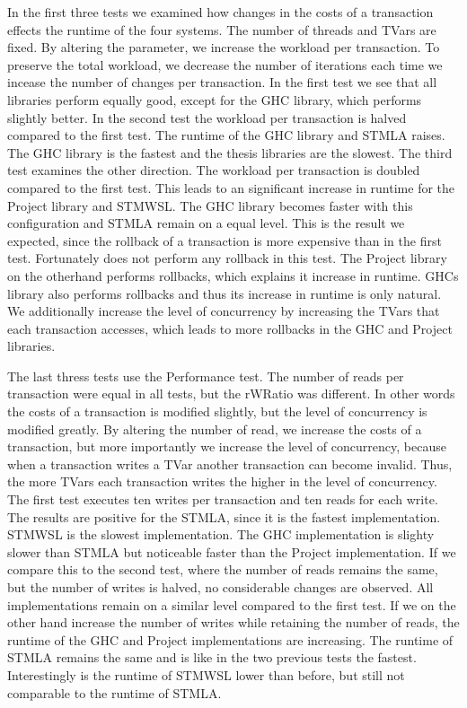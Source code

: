 In the first three tests we examined how changes in the costs of a transaction effects the runtime of the four systems. 
The number of threads and TVars are fixed. By altering the  parameter, we increase the workload per 
transaction. To preserve the total workload, we decrease the number of iterations each time we incease the number
of changes per transaction. In the first test we see that all libraries perform equally good, except for the GHC 
library, which performs slightly better. In the second test the workload per transaction is halved compared to the
first test. The runtime of the GHC library and STMLA raises. The GHC library is the fastest and the thesis libraries 
are the slowest. The third test examines the other direction. The workload per transaction is doubled compared to the 
first test. This leads to an significant increase in runtime for the Project library and STMWSL. The GHC library becomes 
faster with this configuration and STMLA remain on a equal level. This is the result we expected, since the rollback of 
a transaction is more expensive than in the first test. Fortunately does not perform any rollback in this test. The Project
library on the otherhand performs rollbacks, which explains it increase in runtime. GHCs library also performs rollbacks
and thus its increase in runtime is only natural. We additionally increase the level of concurrency by increasing the 
TVars that each transaction accesses, which leads to more rollbacks in the GHC and Project libraries.

The last thress tests use the Performance test. The number of reads per transaction were equal in all tests, but the 
rWRatio was different. In other words the costs of a transaction is modified slightly, but the level of concurrency
is modified greatly. By altering the number of read, we increase the costs of a transaction, but more importantly we 
increase the level of concurrency, because when a transaction writes a TVar another transaction can become invalid.
Thus, the more TVars each transaction writes the higher in the level of concurrency. The first test executes ten writes
per transaction and ten reads for each write. The results are positive for the STMLA, since it is the fastest implementation.
STMWSL is the slowest implementation. The GHC implementation is slighty slower than STMLA but noticeable faster than the 
Project implementation. If we compare this to the second test, where the number of reads remains the same, but the number of
writes is halved, no considerable changes are observed. All implementations remain on a similar level compared to the first
test. If we on the other hand increase the number of writes while retaining the number of reads, the runtime of the
GHC and Project implementations are increasing. The runtime of STMLA remains the same and is like in the two previous 
tests the fastest. Interestingly is the runtime of STMWSL lower than before, but still not comparable to the runtime of
STMLA.

